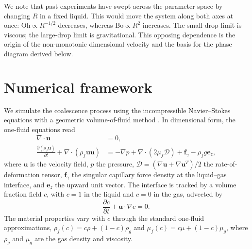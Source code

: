 \documentclass[
reprint,
amsmath,amssymb,
superscriptaddress,
onecolumn,
aps,
prfluids,
longbibliography,
floatfix
]{revtex4-2}
\newcommand{\Oh}{\mathrm{Oh}}
\newcommand{\Bo}{\mathrm{Bo}}
\begin{document}
We note that past experiments \cite{boreyko2009self,mouterde2017merging,lecointre2019ballistics} have swept across the parameter space by changing $R$ in a fixed liquid. This would move the system along both axes at once: $\Oh\propto R^{-1/2}$ decreases, whereas $\Bo\propto R^2$ increases. The small-drop limit is viscous; the large-drop limit is gravitational. This opposing dependence is the origin of the non-monotonic dimensional velocity and the basis for the phase diagram derived below.

\section{Numerical framework}\label{sec:numerics}

We simulate the coalescence process using the incompressible Navier--Stokes equations with a geometric volume-of-fluid method \cite{tryggvason2011direct,popinet2009accurate}. In dimensional form, the one-fluid equations read
\begin{align}
    \nabla\cdot \bm{u} &=0, \label{eq:continuity_dim}\\
    \frac{\partial (\rho_f \bm{u})}{\partial t}+\nabla\cdot(\rho_f \bm{u}\bm{u})
    &= -\nabla p + \nabla\cdot\left(2\mu_f\bm{\mathcal{D}}\right)+\bm{f}_{\gamma}-\rho_f g\bm{e}_z,
    \label{eq:momentum_dim}
\end{align}
where $\bm{u}$ is the velocity field, $p$ the pressure, $\bm{\mathcal{D}}=(\nabla\bm{u}+\nabla\bm{u}^{T})/2$ the rate-of-deformation tensor, $\bm{f}_{\gamma}$ the singular capillary force density at the liquid--gas interface, and $\bm{e}_z$ the upward unit vector. The interface is tracked by a volume fraction field $c$, with $c=1$ in the liquid and $c=0$ in the gas, advected by
\begin{equation}
    \frac{\partial c}{\partial t}+\bm{u}\cdot\nabla c=0.
    \label{eq:vof}
\end{equation}
The material properties vary with $c$ through the standard one-fluid approximations, $\rho_f(c)=c\rho+(1-c)\rho_g$ and $\mu_f(c)=c\mu+(1-c)\mu_g$, where $\rho_g$ and $\mu_g$ are the gas density and viscosity.
\end{document}
